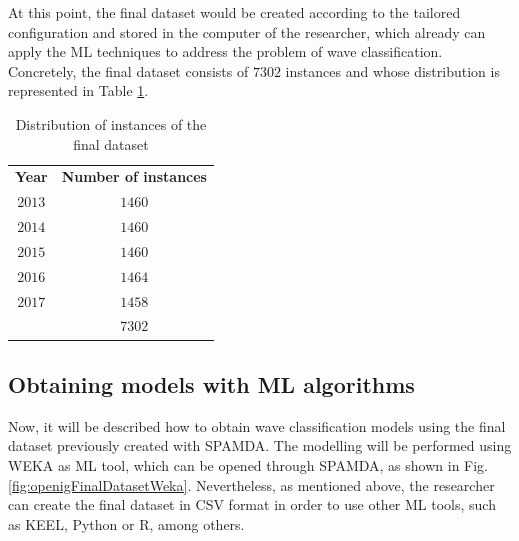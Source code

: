 \documentclass[energies,article,submit,moreauthors,pdftex]{Definitions/mdpi}
\begin{document}
			At this point, the final dataset would be created according to the tailored configuration and stored in the computer of the researcher, which already can apply the ML techniques to address the problem of wave classification. Concretely, the final dataset consists of $7302$ instances and whose distribution is represented in Table \ref{tab:datasetDistribution}.
			
				\begin{table}[!h]
				
					\caption{Distribution of instances of the final dataset}
					\label{tab:datasetDistribution}
					\centering

					\begin{tabular}{cc}
					
						\cline{1-2}
						
						\textbf{Year}&\textbf{Number of instances}\\
	
						\cline{1-2}
						
						$2013$&$1460$\\
						$2014$&$1460$\\
						$2015$&$1460$\\
						$2016$&$1464$\\
						$2017$&$1458$\\
						
						\cline{1-2}
						
						&$7302$\\
						
						\cline{1-2}
							
					\end{tabular}
				
				\end{table}

		
		\subsection{Obtaining models with ML algorithms}
		
			Now, it will be described how to obtain wave classification models using the final dataset previously created with SPAMDA. The modelling will be performed using WEKA as ML tool, which can be opened through SPAMDA, as shown in Fig. \ref{fig:openigFinalDatasetWeka}. Nevertheless, as mentioned above, the researcher can create the final dataset in CSV format in order to use other ML tools, such as KEEL, Python or R, among others.
			
\end{document}
